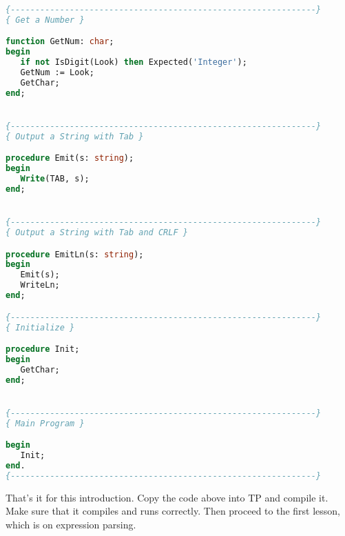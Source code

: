 \documentclass[float=false, crop=false]{standalone}
\begin{document}
\begin{lstlisting}[language=Pascal]
{--------------------------------------------------------------}
{ Get a Number }

function GetNum: char;
begin
   if not IsDigit(Look) then Expected('Integer');
   GetNum := Look;
   GetChar;
end;


{--------------------------------------------------------------}
{ Output a String with Tab }

procedure Emit(s: string);
begin
   Write(TAB, s);
end;


{--------------------------------------------------------------}
{ Output a String with Tab and CRLF }

procedure EmitLn(s: string);
begin
   Emit(s);
   WriteLn;
end;

{--------------------------------------------------------------}
{ Initialize }

procedure Init;
begin
   GetChar;
end;


{--------------------------------------------------------------}
{ Main Program }

begin
   Init;
end.
{--------------------------------------------------------------}
\end{lstlisting}

That's it for this introduction. Copy the code above into TP and compile it.
Make sure that it compiles and runs correctly. Then proceed to the first lesson,
which is on expression parsing.
\end{document}
